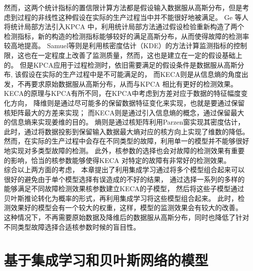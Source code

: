 然而，这两个统计指标的置信限计算方法都是假设输入数据服从高斯分布，但是考虑到过程的非线性这种假设在实际的生产过程当中并不能很好地被满足。
Ge 等人将统计局部方法引入KPCA 中，利用统计局部方法通过假设检验重新构造了两个检测指标，新的构造的检测指标能够较好的满足高斯分布，从而使得故障的检测率较高地提高。
Samuel等则是利用核密度估计（KDE）的方法计算监测指标的控制限，这也在一定程度上改善了监测质量，然而，这也是建立在一定的假设基础上的。
但是KPCA应用于过程检测时，依旧需要满足的假设条件是数据服从高斯分布,
该假设在实际的生产过程中是不可能满足的，
而KECA则是从信息熵的角度出发，不再要求原始数据服从高斯分布，从而与KPCA 相比有更好的检测效果。\\
KECA的原理与KPCA有所不同，在KPCA中考虑到方差对应于数据的特征幅度变化方向，
降维则是通过尽可能多的保留数据特征变化来实现，也就是要通过保留核矩阵最大的方差来实现；
而KECA则是通过引入信息熵的概念，通过保留最大的信息熵来实现姜维的目的。
熵则是通过核矩阵利用Parzen窗实现其密度估计，此时，通过将数据投影到保留输入数据最大熵对应的核方向上实现了维数的降低。然而，在实际的生产过程中会存在不同类型的故障，利用单一的模型并不能够很好地实现对多类型故障的检测。
此外，核参数的选择也会对故障的检测效果有重要的影响，恰当的核参数能够使得KECA 对特定的故障有非常好的检测效果。\\
综合以上两方面的考虑，
本章提出了利用集成学习通过将多个模型组合起来可以很好的避免由于单个模型选择有误造成的不好的结果，
通过选择一系列的多样的能够满足不同故障检测效果核参数建立KECA的子模型，
然后将这些子模型通过贝叶斯推论转化为概率的形式，再利用集成学习将这些模型组合起来。
此时，检测效果好的模型会有一个较大的权重，这样，模型的监测效果会有较大的改善。
这种情况下，不再需要原始数据及降维后的数据服从高斯分布，同时也降低了针对不同类型故障选择合适核参数时候的盲目性。

\section{基于集成学习和贝叶斯网络的模型}
